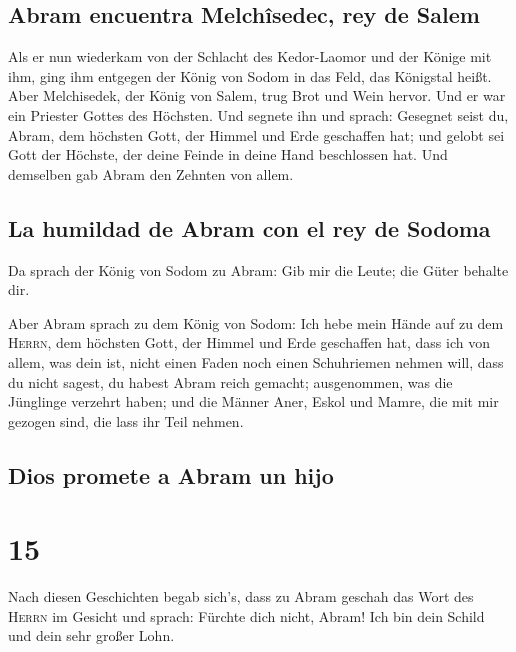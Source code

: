 \hypertarget{abram-encuentra-melchuxeesedec-rey-de-salem}{%
\subsection{Abram encuentra Melchîsedec, rey de
Salem}\label{abram-encuentra-melchuxeesedec-rey-de-salem}}

 Als er nun wiederkam von der Schlacht des Kedor-Laomor
und der Könige mit ihm, ging ihm entgegen der König von Sodom in das
Feld, das Königstal heißt.  Aber Melchisedek, der König
von Salem, trug Brot und Wein hervor. Und er war ein Priester Gottes des
Höchsten.  Und segnete ihn und sprach: Gesegnet seist du,
Abram, dem höchsten Gott, der Himmel und Erde geschaffen hat;
 und gelobt sei Gott der Höchste, der deine Feinde in
deine Hand beschlossen hat. Und demselben gab Abram den Zehnten von
allem.

\hypertarget{la-humildad-de-abram-con-el-rey-de-sodoma}{%
\subsection{La humildad de Abram con el rey de
Sodoma}\label{la-humildad-de-abram-con-el-rey-de-sodoma}}

 Da sprach der König von Sodom zu Abram: Gib mir die
Leute; die Güter behalte dir.

 Aber Abram sprach zu dem König von Sodom: Ich hebe mein
Hände auf zu dem \textsc{Herrn}, dem höchsten Gott, der Himmel und Erde
geschaffen hat,  dass ich von allem, was dein ist, nicht
einen Faden noch einen Schuhriemen nehmen will, dass du nicht sagest, du
habest Abram reich gemacht;  ausgenommen, was die
Jünglinge verzehrt haben; und die Männer Aner, Eskol und Mamre, die mit
mir gezogen sind, die lass ihr Teil nehmen.

\hypertarget{dios-promete-a-abram-un-hijo}{%
\subsection{Dios promete a Abram un
hijo}\label{dios-promete-a-abram-un-hijo}}

\hypertarget{section-14}{%
\section{15}\label{section-14}}

 Nach diesen Geschichten begab sich's, dass zu Abram
geschah das Wort des \textsc{Herrn} im Gesicht und sprach: Fürchte dich
nicht, Abram! Ich bin dein Schild und dein sehr großer Lohn.


